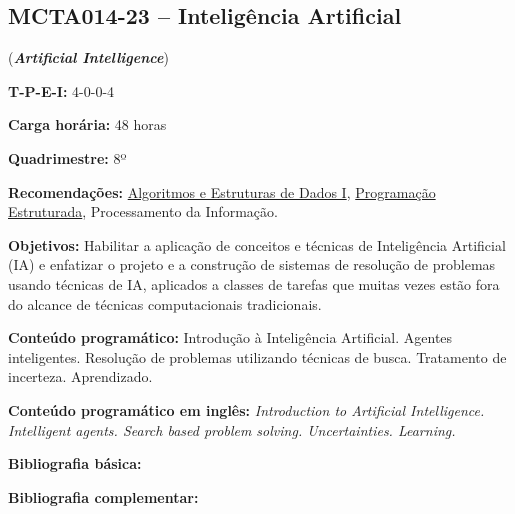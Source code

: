 \documentclass[class=article, crop=false]{standalone}
\begin{document}
\subsection*{MCTA014-23 -- Inteligência Artificial}
\label{disc:ia}

(\textbf{\textit{Artificial Intelligence}})

\begin{center}
    \begin{minipage}{0.85\textwidth}
        \textbf{T-P-E-I:} 4-0-0-4
        
        \textbf{Carga horária:} 48 horas
        
        \textbf{Quadrimestre:} 8º
        
        \textbf{Recomendações:} 
        \hyperref[disc:aedI]{Algoritmos e Estruturas de Dados I},
        \hyperref[disc:pe]{Programação Estruturada},
        Processamento da Informação.
    \end{minipage}
\end{center}

\textbf{Objetivos:}
Habilitar a aplicação de conceitos e técnicas de Inteligência Artificial (IA) e
enfatizar o projeto e a construção de sistemas de resolução de problemas usando
técnicas de IA, aplicados a classes de tarefas que muitas vezes estão fora do
alcance de técnicas computacionais tradicionais.

\textbf{Conteúdo programático:}
Introdução à Inteligência Artificial.
Agentes inteligentes.
Resolução de problemas utilizando técnicas de busca.
Tratamento de incerteza.
Aprendizado.

\textbf{Conteúdo programático em inglês:}
\textit{Introduction to Artificial Intelligence.
Intelligent agents.
Search based problem solving.
Uncertainties.
Learning.}

\newrefsection
\textbf{Bibliografia básica:}
\nocite{2003-russel-etal,2003-rezende,1998-sutton-etal}
\printbibliography

\newrefsection
\textbf{Bibliografia complementar:}
\nocite{2006-bittencourt,2004-branchman,2001-mortari,2018-sutton-etal,2009-wooldridge}
\printbibliography
\end{document}
